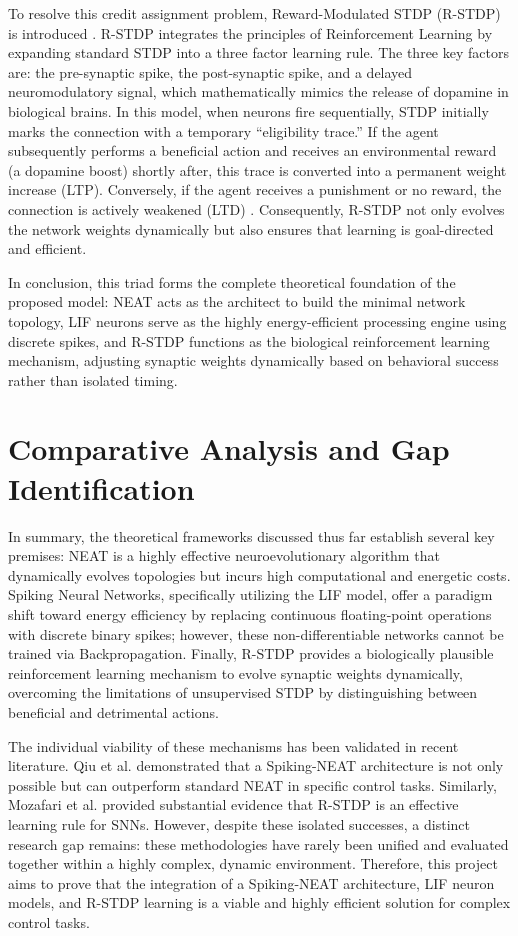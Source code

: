 To resolve this credit assignment problem, Reward-Modulated STDP (R-STDP) is introduced \cite{mozafari2018}. R-STDP integrates the principles of Reinforcement Learning by expanding standard STDP into a three factor learning rule. The three key factors are: the pre-synaptic spike, the post-synaptic spike, and a delayed neuromodulatory signal, which mathematically mimics the release of dopamine in biological brains. In this model, when neurons fire sequentially, STDP initially marks the connection with a temporary ``eligibility trace.'' If the agent subsequently performs a beneficial action and receives an environmental reward (a dopamine boost) shortly after, this trace is converted into a permanent weight increase (LTP). Conversely, if the agent receives a punishment or no reward, the connection is actively weakened (LTD) \cite{mozafari2018}. Consequently, R-STDP not only evolves the network weights dynamically but also ensures that learning is goal-directed and efficient.

In conclusion, this triad forms the complete theoretical foundation of the proposed model: NEAT acts as the architect to build the minimal network topology, LIF neurons serve as the highly energy-efficient processing engine using discrete spikes, and R-STDP functions as the biological reinforcement learning mechanism, adjusting synaptic weights dynamically based on behavioral success rather than isolated timing.



\section{Comparative Analysis and Gap Identification}

In summary, the theoretical frameworks discussed thus far establish several key premises: NEAT is a highly effective neuroevolutionary algorithm that dynamically evolves topologies but incurs high computational and energetic costs. Spiking Neural Networks, specifically utilizing the LIF model, offer a paradigm shift toward energy efficiency by replacing continuous floating-point operations with discrete binary spikes; however, these non-differentiable networks cannot be trained via Backpropagation. Finally, R-STDP provides a biologically plausible reinforcement learning mechanism to evolve synaptic weights dynamically, overcoming the limitations of unsupervised STDP by distinguishing between beneficial and detrimental actions.

The individual viability of these mechanisms has been validated in recent literature. Qiu et al. \cite{qiu2018evolving} demonstrated that a Spiking-NEAT architecture is not only possible but can outperform standard NEAT in specific control tasks. Similarly, Mozafari et al. \cite{mozafari2018} provided substantial evidence that R-STDP is an effective learning rule for SNNs. However, despite these isolated successes, a distinct research gap remains: these methodologies have rarely been unified and evaluated together within a highly complex, dynamic environment. Therefore, this project aims to prove that the integration of a Spiking-NEAT architecture, LIF neuron models, and R-STDP learning is a viable and highly efficient solution for complex control tasks.

